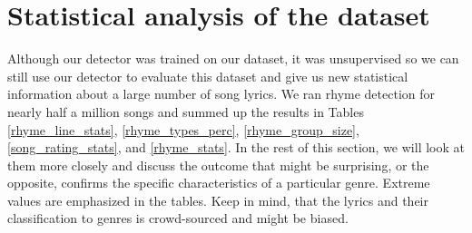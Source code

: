 \section{Statistical analysis of the dataset}
Although our detector was trained on our dataset, it was unsupervised so we can still use our detector to evaluate this dataset and give us new statistical information about a large number of song lyrics. We ran rhyme detection for nearly half a million songs and summed up the results in Tables \ref{rhyme_line_stats}, \ref{rhyme_types_perc}, \ref{rhyme_group_size}, \ref{song_rating_stats}, and \ref{rhyme_stats}. In the rest of this section, we will look at them more closely and discuss the outcome that might be surprising, or the opposite, confirms the specific  characteristics of a particular genre. Extreme values are emphasized in the tables. Keep in mind, that the lyrics and their classification to genres is crowd-sourced and might be biased.
% 
